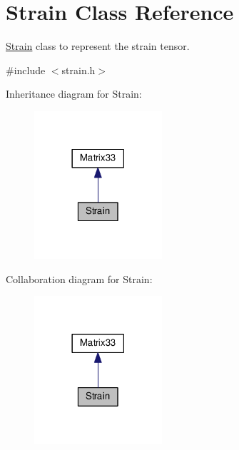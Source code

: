 \hypertarget{classStrain}{\section{Strain Class Reference}
\label{d1/d3c/classStrain}
}


\hyperlink{classStrain}{Strain} class to represent the strain tensor.  




{\ttfamily \#include $<$strain.\-h$>$}



Inheritance diagram for Strain\-:\nopagebreak
\begin{figure}[H]
\begin{center}
\leavevmode
\includegraphics[width=134pt]{d6/d0f/classStrain__inherit__graph}
\end{center}
\end{figure}


Collaboration diagram for Strain\-:\nopagebreak
\begin{figure}[H]
\begin{center}
\leavevmode
\includegraphics[width=134pt]{db/db8/classStrain__coll__graph}
\end{center}
\end{figure}
